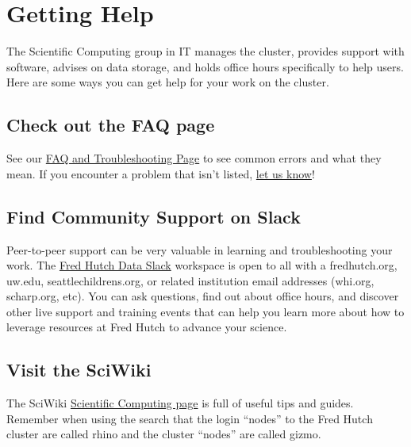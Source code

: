 \documentclass[
]{book}
\begin{document}
\hypertarget{help}{%
\chapter{Getting Help}\label{help}}

The Scientific Computing group in IT manages the cluster, provides support with software, advises on data storage, and holds office hours specifically to help users. Here are some ways you can get help for your work on the cluster.

\hypertarget{check-out-the-faq-page}{%
\section*{Check out the FAQ page}\label{check-out-the-faq-page}}

See our \protect\hyperlink{faq-and-troubleshooting}{FAQ and Troubleshooting Page} to see common errors and what they mean. If you encounter a problem that isn't listed, \protect\hyperlink{feedback}{let us know}!

\hypertarget{find-community-support-on-slack}{%
\section*{Find Community Support on Slack}\label{find-community-support-on-slack}}

Peer-to-peer support can be very valuable in learning and troubleshooting your work. The \href{https://fhdata.slack.com}{Fred Hutch Data Slack} workspace is open to all with a fredhutch.org, uw.edu, seattlechildrens.org, or related institution email addresses (whi.org, scharp.org, etc). You can ask questions, find out about office hours, and discover other live support and training events that can help you learn more about how to leverage resources at Fred Hutch to advance your science.

\hypertarget{visit-the-sciwiki}{%
\section*{Visit the SciWiki}\label{visit-the-sciwiki}}

The SciWiki \href{https://sciwiki.fredhutch.org/scicomputing/comp_index/}{Scientific Computing page} is full of useful tips and guides. Remember when using the search that the login ``nodes'' to the Fred Hutch cluster are called rhino and the cluster ``nodes'' are called gizmo.
\end{document}
